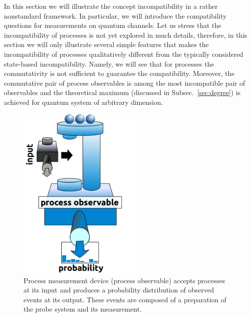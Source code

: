 \documentclass[12pt]{article}
\theoremstyle{definition}
\begin{document}
{In this section we will illustrate the concept incompatibility in a 
rather nonstandard framework. In particular, we will introduce the 
compatibility questions for measurements on quantum channels. Let us stress that
the incompatibility of processes is not yet explored in much details,
therefore, in this section we will only illustrate several simple features 
that makes the incompatibility of processes qualitatively different from 
the typically considered state-based incompatibility. Namely, we will see 
that for processes the commutativity is not sufficient to guarantee 
the compatibility. Moreover, the commutative pair of process observables 
is among the most incompatible pair of observables and the theoretical
maximum (discussed in Subsec.~\ref{sec:degree}) is achieved 
for quantum system of arbitrary dimension.

\begin{figure}\begin{center}
\includegraphics[width=6cm]{fig_process.png}
\caption{Process measurement device (process observable) accepts
processes at its input and produces a probability distribution
of observed events at its output. These events are composed of
a preparation of the probe system and its measurement.}
\end{center}
\end{figure}

}
\end{document}
